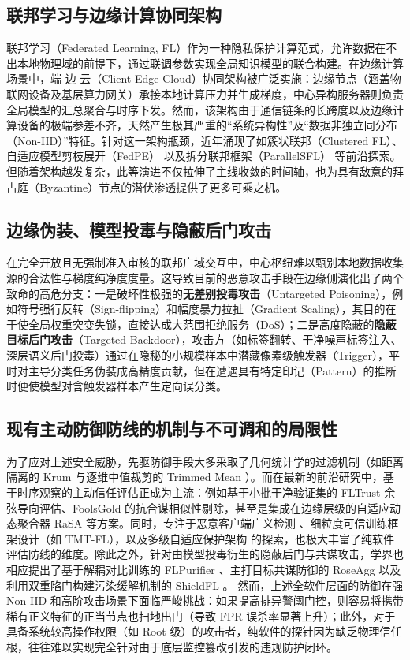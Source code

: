 \documentclass[11pt, a4paper, UTF8, fontset=fandol]{ctexart}
\begin{document}
\subsection{联邦学习与边缘计算协同架构}
联邦学习（Federated Learning, FL）作为一种隐私保护计算范式，允许数据在不出本地物理域的前提下，通过联调参数实现全局知识模型的联合构建。在边缘计算场景中，端-边-云（Client-Edge-Cloud）协同架构被广泛实施：边缘节点（涵盖物联网设备及基层算力网关）承接本地计算压力并生成梯度，中心异构服务器则负责全局模型的汇总聚合与时序下发。然而，该架构由于通信链条的长跨度以及边缘计算设备的极端参差不齐，天然产生极其严重的“系统异构性”及“数据非独立同分布（Non-IID）”特征。针对这一架构瓶颈，近年涌现了如簇状联邦（Clustered FL）\cite{r9_clustered}、自适应模型剪枝展开（FedPE）\cite{fedpe} 以及拆分联邦框架（ParallelSFL）\cite{parallelsfl} 等前沿探索。但随着架构越发复杂，此等演进不仅拉伸了主线收敛的时间轴，也为具有敌意的拜占庭（Byzantine）节点的潜伏渗透提供了更多可乘之机。

\subsection{边缘伪装、模型投毒与隐蔽后门攻击}
在完全开放且无强制准入审核的联邦广域交互中，中心枢纽难以甄别本地数据收集源的合法性与梯度纯净度度量。这导致目前的恶意攻击手段在边缘侧演化出了两个致命的高危分支：一是破坏性极强的\textbf{无差别投毒攻击}（Untargeted Poisoning），例如符号强行反转（Sign-flipping）和幅度暴力拉扯（Gradient Scaling），其目的在于使全局权重突变失锁，直接达成大范围拒绝服务（DoS）；二是高度隐蔽的\textbf{隐蔽目标后门攻击}（Targeted Backdoor），攻击方（如标签翻转、干净噪声标签注入、深层语义后门投毒）通过在隐秘的小规模样本中潜藏像素级触发器（Trigger），平时对主导分类任务伪装成高精度贡献，但在遭遇具有特定印记（Pattern）的推断时便使模型对含触发器样本产生定向误分类。

\subsection{现有主动防御防线的机制与不可调和的局限性}
为了应对上述安全威胁，先驱防御手段大多采取了几何统计学的过滤机制（如距离隔离的 Krum \cite{blanchard2017krum} 与逐维中值裁剪的 Trimmed Mean \cite{yin2018byzantine}）。而在最新的前沿研究中，基于时序观察的主动信任评估正成为主流：例如基于小批干净验证集的 FLTrust 余弦导向评估\cite{cao2021fltrust}、FoolsGold 的抗合谋相似性剔除\cite{fung2020foolsgold}，甚至是集成在边缘层级的自适应动态聚合器 RaSA\cite{wang2025rasa} 等方案。同时，专注于恶意客户端广义检测 \cite{dou2025toward}、细粒度可信训练框架设计（如 TMT-FL）\cite{lu2025tmt}，以及多级自适应保护架构 \cite{wang2024federated} 的探索，也极大丰富了纯软件评估防线的维度。除此之外，针对由模型投毒衍生的隐蔽后门与共谋攻击，学界也相应提出了基于解耦对比训练的 FLPurifier \cite{flpurifier}、主打目标共谋防御的 RoseAgg \cite{roseagg} 以及利用双重陷门构建污染缓解机制的 ShieldFL \cite{shieldfl}。
然而，上述全软件层面的防御在强 Non-IID 和高阶攻击场景下面临严峻挑战：如果提高排异警阈门控，则容易将携带稀有正义特征的正当节点也扫地出门（导致 FPR 误杀率显著上升）；此外，对于具备系统较高操作权限（如 Root 级）的攻击者，纯软件的探针因为缺乏物理信任根，往往难以实现完全针对由于底层监控篡改引发的违规防护闭环。
\end{document}
